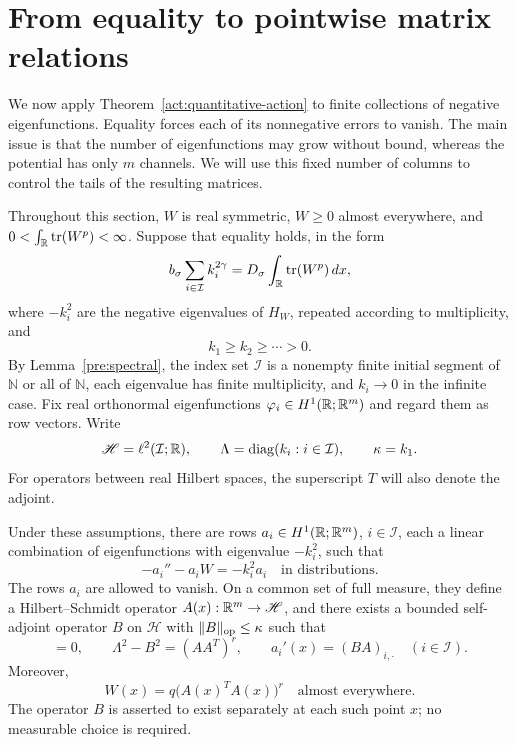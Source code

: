 \section{From equality to pointwise matrix relations}
\label{comp:section}

We now apply Theorem~\ref{act:quantitative-action} to finite collections of
negative eigenfunctions.  Equality forces each of its nonnegative errors to
vanish.  The main issue is that the number of eigenfunctions may grow without
bound, whereas the potential has only $m$ channels.  We will use this fixed
number of columns to control the tails of the resulting matrices.

Throughout this section, $W$ is real symmetric, $W\geq0$ almost everywhere,
and $0<\int_{\mathbb R}\operatorname{tr}(W^p)<\infty$.  Suppose that equality holds, in the form
\begin{equation}
 b_\sigma\sum_{i\in\mathcal I}k_i^{2\gamma}
   =D_\sigma\int_{\mathbb R}\operatorname{tr}(W^p)\,dx,
 \label{comp:equality}
\end{equation}
where $-k_i^2$ are the negative eigenvalues of $H_W$, repeated according to
multiplicity, and
\[
 k_1\geq k_2\geq\cdots>0.
\]
By Lemma~\ref{pre:spectral}, the index set $\mathcal I$ is a nonempty finite
initial segment of $\mathbb N$ or all of $\mathbb N$, each eigenvalue has
finite multiplicity, and $k_i\to0$ in the infinite case.  Fix real
orthonormal eigenfunctions $\varphi_i\in H^1(\mathbb R;\mathbb R^m)$ and regard them as
row vectors.  Write
\[
 \mathscr H=\ell^2(\mathcal I;\mathbb R),\qquad
 \Lambda=\operatorname{diag}(k_i:i\in\mathcal I),\qquad \kappa=k_1.
\]
For operators between real Hilbert spaces, the superscript $T$ will also
denote the adjoint.

\begin{proposition}
\label{comp:relations}
Under these assumptions, there are rows $a_i\in H^1(\mathbb R;\mathbb R^m)$,
$i\in\mathcal I$, each a linear combination of eigenfunctions with
eigenvalue $-k_i^2$, such that
\begin{equation}
 -a_i''-a_iW=-k_i^2a_i
 \quad\text{in distributions.}
 \label{comp:row-eigenfunction}
\end{equation}
The rows $a_i$ are allowed to vanish.  On a common set of full measure, they
define a Hilbert--Schmidt operator $A(x):\mathbb R^m\to\mathscr H$, and there exists
a bounded self-adjoint operator $B$ on $\mathscr H$ with
$\|B\|_{\operatorname{op}}\leq\kappa$ such that
\begin{equation}
 [B,\Lambda^2]=0,\qquad
 \Lambda^2-B^2=(AA^T)^r,\qquad
 a_i'(x)=(BA)_{i,\cdot}\quad(i\in\mathcal I).
 \label{comp:limit-relations}
\end{equation}
Moreover,
\begin{equation}
 W(x)=q\bigl(A(x)^TA(x)\bigr)^r
 \quad\text{almost everywhere.}
 \label{comp:potential-limit}
\end{equation}
The operator $B$ is asserted to exist separately at each such point $x$;
no measurable choice is required.
\end{proposition}

